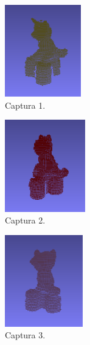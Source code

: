 \begin{figure}[h]
    \centering
    \begin{subfigure}[t]{0.2\textheight}
    	\centering
        \includegraphics[height=4cm]{archivos/ejemplo-acumulacion-transformacion-captura-1.png}
        \caption{Captura 1.}
        \label{fig:ejemplo-acumulacion-transformacion-captura-1}
    \end{subfigure}
    \begin{subfigure}[t]{0.2\textheight}
    	\centering
        \includegraphics[height=4cm]{archivos/ejemplo-acumulacion-transformacion-captura-2.png}
        \caption{Captura 2.}
        \label{fig:ejemplo-acumulacion-transformacion-captura-2}
    \end{subfigure}
    \begin{subfigure}[t]{0.2\textheight}
    	\centering
        \includegraphics[height=4cm]{archivos/ejemplo-acumulacion-transformacion-captura-3.png}
        \caption{Captura 3.}
        \label{fig:ejemplo-acumulacion-transformacion-captura-3}
    \end{subfigure}
    \begin{subfigure}[t]{0.2\textheight}

\end{subfigure}
\end{figure}

